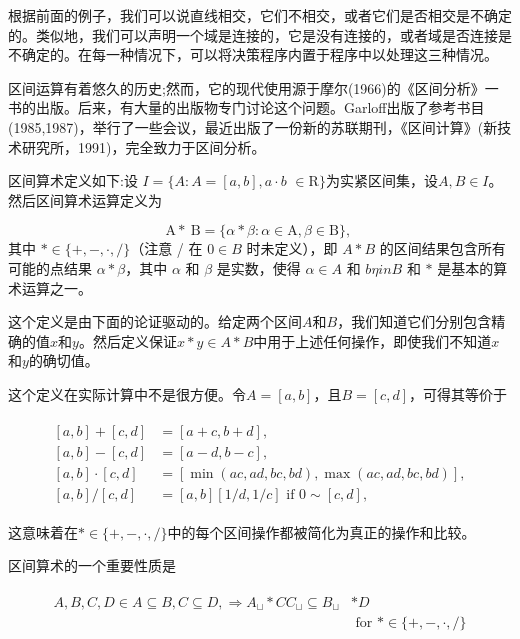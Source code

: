 \begin{CJK}{UTF8}{gbsn}
根据前面的例子，我们可以说直线相交，它们不相交，或者它们是否相交是不确定的。类似地，我们可以声明一个域是连接的，它是没有连接的，或者域是否连接是不确定的。在每一种情况下，可以将决策程序内置于程序中以处理这三种情况。


区间运算有着悠久的历史;然而，它的现代使用源于摩尔(1966)的《区间分析》一书的出版。后来，有大量的出版物专门讨论这个问题。Garloff出版了参考书目(1985,1987)，举行了一些会议，最近出版了一份新的苏联期刊，《区间计算》(新技术研究所，1991)，完全致力于区间分析。

区间算术定义如下:设 $I=\{A: A=[a, b], a \cdot b$ $\in \mathrm{R}\}$为实紧区间集，设$A, B \in I$。然后区间算术运算定义为

$$
\mathrm{A} * \mathrm{~B}=\{\alpha * \beta: \alpha \in \mathrm{A}, \beta \in \mathrm{B}\} \text {, }
$$
其中 $* \in\{+,-, \cdot, /\}$（注意 / 在 $0 \in B$ 时未定义），即 $A * B$ 的区间结果包含所有可能的点结果 $\alpha * \beta$，其中 $\alpha$ 和 $\beta$ 是实数，使得 $\alpha \in A$ 和 $b\eta in B$ 和 $*$ 是基本的算术运算之一。

这个定义是由下面的论证驱动的。给定两个区间$A$和$B$，我们知道它们分别包含精确的值$x$和$y$。然后定义保证$x * y \in A * B$中用于上述任何操作，即使我们不知道$x$和$y$的确切值。

这个定义在实际计算中不是很方便。令$A=[a, b]$，且$ B=[c, d]$，可得其等价于

\begin{align}
\begin{aligned}
{[a, b]+[c, d] } &=[a+c, b+d], \\
{[a, b]-[c, d] } &=[a-d, b-c], \\
{[a, b] \cdot[c, d] } &=[\min (a c, a d, b c, b d), \max (a c, a d, b c, b d)], \\
{[a, b] /[c, d] } &=[a, b][1 / d, 1 / c] \text { if } 0 \sim[c, d],
\end{aligned}
\end{align}

这意味着在$* \in\{+,-, \cdot, /\}$中的每个区间操作都被简化为真正的操作和比较。


区间算术的一个重要性质是


\begin{align}
\begin{aligned}
A, B, C, D \in A \subseteq B, C \subseteq D, \Rightarrow A_{\sqcup} * C C_{\sqcup} \subseteq B_{\sqcup} & * D \\
& \text { for } * \in\{+,-, \cdot, /\}
\end{aligned}
\end{align}


\end{CJK}
